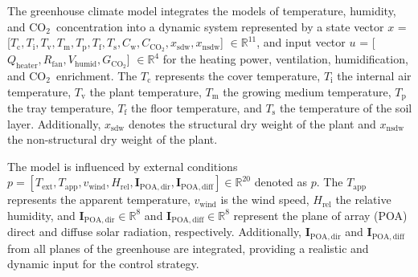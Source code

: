 \documentclass[conference]{IEEEtran}
\newcommand{\ui}[2]{#1_{\mathrm{#2}}}
\newcommand{\coo}{\ensuremath{\mathrm{CO_2}}}
\begin{document}
The greenhouse climate model integrates the models of temperature, humidity, and \coo\ concentration into a dynamic system represented by a state vector \linebreak \(x\) = [\(\ui{T}{c}, \ui{T}{i}, \ui{T}{v}, \ui{T}{m}, \ui{T}{p}, \ui{T}{f}, \ui{T}{s}, \ui{C}{w}, \ui{C}{\coo}, \ui{x}{sdw}, \ui{x}{nsdw}\)] \( \in\mathbb R^{11} \), and input vector \(u\) = [\(\ui{Q}{heater}, \ui{R}{fan}, \ui{V}{humid}, \ui{G}{\coo} \)] \( \in\mathbb R^{4} \) for the heating power, ventilation, humidification, and \coo\ enrichment. The \(\ui{T}{c}\) represents the cover temperature, \(\ui{T}{i}\) the internal air temperature, \(\ui{T}{v}\) the plant temperature, \(\ui{T}{m}\) the growing medium temperature, \(\ui{T}{p}\) the tray temperature, \(\ui{T}{f}\) the floor temperature, and \(\ui{T}{s}\) the temperature of the soil layer. Additionally, \(\ui{x}{sdw}\) denotes the structural dry weight of the plant and \(\ui{x}{nsdw}\) the non-structural dry weight of the plant.

The model is influenced by external conditions \linebreak \( p = \left[
    \ui{T}{ext}, \ui{T}{app}, \ui{v}{wind}, \ui{H}{rel}, \ui{\mathbf{I}}{POA,dir}, \ui{\mathbf{I}}{POA,diff} \right] \in \mathbb{R}^{20} \) denoted as \(p\). The \(\ui{T}{app}\) represents the apparent temperature, \(\ui{v}{wind}\) is the wind speed, \(\ui{H}{rel}\) the relative humidity, and \(\ui{\mathbf{I}}{POA,dir}\in \mathbb{R}^{8}\) and \(\ui{\mathbf{I}}{POA,diff}\in \mathbb{R}^{8}\) represent the plane of array (POA) direct and diffuse solar radiation, respectively. Additionally, \(\ui{\mathbf{I}}{POA,dir}\) and \(\ui{\mathbf{I}}{POA,diff}\) from all planes of the greenhouse are integrated, providing a realistic and dynamic input for the control strategy.
\end{document}
